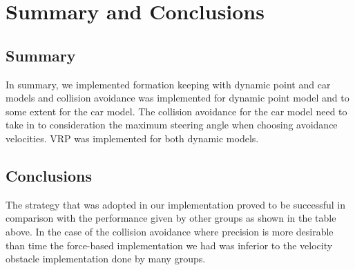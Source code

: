 \documentclass[a4paper,12pt]{article}
\begin{document}
\section{Summary and Conclusions}
\label{sec:summary}
\subsection{Summary}
In summary, we implemented formation keeping with dynamic point and car models and collision avoidance was implemented for dynamic point model and to some extent for the car model. The collision avoidance for the car model need to take in to consideration the maximum steering angle when choosing avoidance velocities. VRP was implemented for both dynamic models.     
\subsection{Conclusions}
The strategy that was adopted in our implementation proved to be successful in comparison with the performance given by other groups as shown in the table above. In the case of the collision avoidance where precision is more desirable than time the force-based implementation we had was inferior to the velocity obstacle implementation done by many groups. 

\pagebreak
{}

\end{document}

